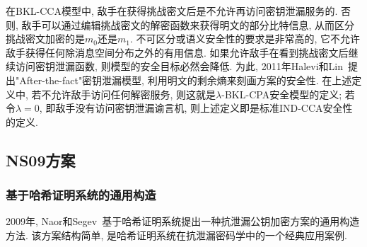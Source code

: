 \begin{note}
在BKL-CCA模型中, 敌手在获得挑战密文后是不允许再访问密钥泄漏服务的. 否则, 敌手可以通过编辑挑战密文的解密函数来获得明文的部分比特信息, 从而区分挑战密文加密的是$m_0$还是$m_1$. 不可区分或语义安全性的要求是非常高的, 它不允许敌手获得任何除消息空间分布之外的有用信息. 如果允许敌手在看到挑战密文后继续访问密钥泄漏函数, 则模型的安全目标必然会降低. 为此, 2011年Halevi和Lin~\cite{HL-TCC-2011}提出"After-the-fact"密钥泄漏模型, 利用明文的剩余熵来刻画方案的安全性. 在上述定义中, 若不允许敌手访问任何解密服务, 则这就是$\lambda$-BKL-CPA安全模型的定义; 若令$\lambda=0$, 即敌手没有访问密钥泄漏谕言机, 则上述定义即是标准IND-CCA安全性的定义.        
\end{note}

\subsection{NS09方案}
\subsubsection{基于哈希证明系统的通用构造}
2009年, Naor和Segev~\cite{NS-CRYPTO-2009}基于哈希证明系统提出一种抗泄漏公钥加密方案的通用构造方法. 该方案结构简单, 是哈希证明系统在抗泄漏密码学中的一个经典应用案例.

